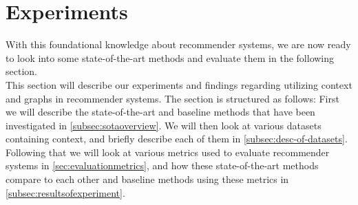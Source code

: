 \section{Experiments}\label{sec:experiments}
With this foundational knowledge about recommender systems, we are now ready to look into some state-of-the-art methods and evaluate them in the following section.\\ 
This section will describe our experiments and findings regarding utilizing context and graphs in recommender systems.
The section is structured as follows: First we will describe the state-of-the-art and baseline methods that have been investigated in \autoref{subsec:sotaoverview}.
We will then look at various datasets containing context, and briefly describe each of them in \autoref{subsec:desc-of-datasets}.
Following that we will look at various metrics used to evaluate recommender systems in \autoref{sec:evaluationmetrics}, and how these state-of-the-art methods compare to each other and baseline methods using these metrics in \autoref{subsec:resultsofexperiment}.





